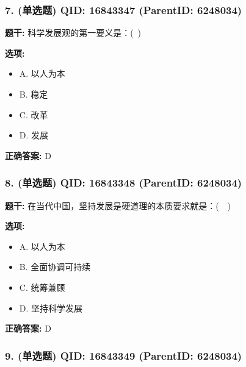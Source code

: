 \documentclass[12pt,UTF8]{ctexart}
\begin{document}
\subsubsection*{7. (单选题) \small QID: 16843347 (ParentID: 6248034)}

\textbf{题干:}
科学发展观的第一要义是：( )



\textbf{选项:}
\begin{itemize}[leftmargin=*]

  \item A. 以人为本

  \item B. 稳定

  \item C. 改革

  \item D. 发展

\end{itemize}

\textbf{正确答案:}
D

\vspace{0.3em}\hrulefill\vspace{0.7em}

\subsubsection*{8. (单选题) \small QID: 16843348 (ParentID: 6248034)}

\textbf{题干:}
在当代中国，坚持发展是硬道理的本质要求就是：(  )



\textbf{选项:}
\begin{itemize}[leftmargin=*]

  \item A. 以人为本

  \item B. 全面协调可持续

  \item C. 统筹兼顾

  \item D. 坚持科学发展

\end{itemize}

\textbf{正确答案:}
D

\vspace{0.3em}\hrulefill\vspace{0.7em}

\subsubsection*{9. (单选题) \small QID: 16843349 (ParentID: 6248034)}
\end{document}
